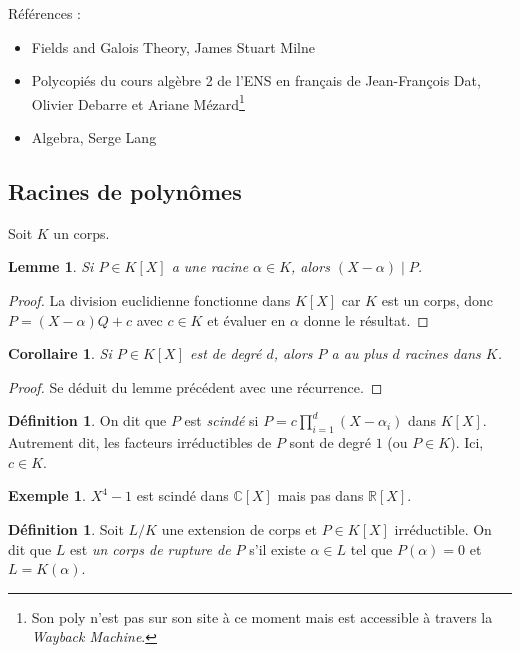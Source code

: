 \documentclass{article}
\newcommand{\R}{\mathbb{R}}
\newcommand{\C}{\mathbb{C}}
\theoremstyle{plain}
\newtheorem{lemma}[theorem]{Lemme}
\newtheorem{corollary}[theorem]{Corollaire}
\theoremstyle{definition}
\newtheorem{definition}[theorem]{Définition}
\newtheorem{example}[theorem]{Exemple}
\theoremstyle{remark}
\begin{document}
Références :
\begin{itemize}
    \item Fields and Galois Theory, James Stuart Milne
    \item Polycopiés du cours algèbre 2 de l'ENS en français de Jean-François Dat, Olivier Debarre et Ariane Mézard\footnote{Son poly n'est pas sur son site à ce moment mais est accessible à travers la \emph{Wayback Machine}.}
    \item Algebra, Serge Lang
\end{itemize}

\subsection{Racines de polynômes}

Soit $K$ un corps.

\begin{lemma}
    Si $P \in K[X]$ a une racine $\alpha \in K$, alors $(X-\alpha) \mid P$.
\end{lemma}

\begin{proof}
    La division euclidienne fonctionne dans $K[X]$ car $K$ est un corps, donc $P = (X-\alpha)Q + c$ avec $c \in K$ et évaluer en $\alpha$ donne le résultat.
\end{proof}

\begin{corollary}
    Si $P \in K[X]$ est de degré $d$, alors $P$ a au plus $d$ racines dans $K$.
\end{corollary}

\begin{proof}
    Se déduit du lemme précédent avec une récurrence.
\end{proof}

\begin{definition}
    On dit que $P$ est \emph{scindé} si $P = c \prod\limits_{i=1}^d (X-\alpha_i)$ dans $K[X]$. Autrement dit, les facteurs irréductibles de $P$ sont de degré $1$ (ou $P \in K$). Ici, $c \in K$.
\end{definition}

\begin{example}
    $X^4 - 1$ est scindé dans $\C[X]$ mais pas dans $\R[X]$.
\end{example}

\begin{definition}
    Soit $L/K$ une extension de corps et $P \in K[X]$ irréductible. On dit que $L$ est \emph{un corps de rupture de $P$} s'il existe $\alpha \in L$ tel que $P(\alpha) = 0$ et $L=K(\alpha)$.
\end{definition}
\end{document}
